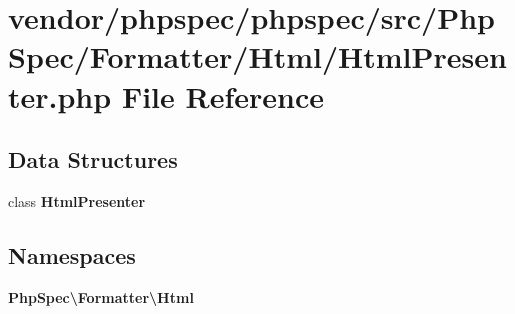 \section{vendor/phpspec/phpspec/src/\+Php\+Spec/\+Formatter/\+Html/\+Html\+Presenter.php File Reference}
\label{_html_presenter_8php}
\subsection*{Data Structures}
\begin{DoxyCompactItemize}
\item 
class {\bf Html\+Presenter}
\end{DoxyCompactItemize}
\subsection*{Namespaces}
\begin{DoxyCompactItemize}
\item 
 {\bf Php\+Spec\textbackslash{}\+Formatter\textbackslash{}\+Html}
\end{DoxyCompactItemize}
